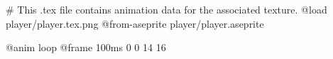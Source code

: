 # This .tex file contains animation data for the associated texture.
@load player/player.tex.png
@from-aseprite player/player.aseprite

@anim loop
	@frame 100ms 0 0 14 16
